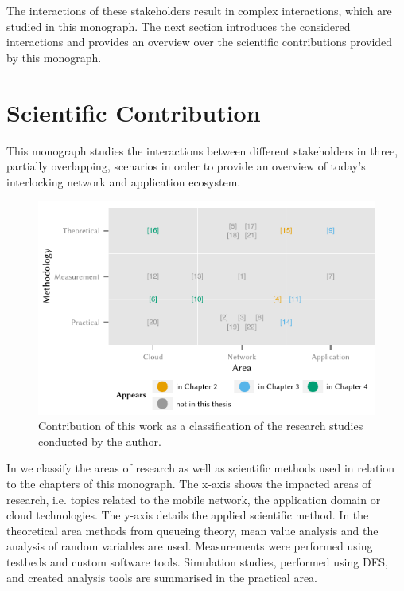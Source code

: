 The interactions of these stakeholders result in complex interactions, which are studied in this monograph.
The next section introduces the considered interactions and provides an overview over the scientific contributions provided by this monograph.

\section{Scientific Contribution}\label{sec:introduction:scientific_contribution}
This monograph studies the interactions between different stakeholders in three, partially overlapping, scenarios in order to provide an overview of today's interlocking network and application ecosystem.

\begin{figure}
\centering
\includegraphics{figures/publications}
\caption{Contribution of this work as a classification of the research studies conducted by the author.}\label{fig:introduction:publications}
\end{figure}

In  we classify the areas of research as well as scientific methods used in relation to the chapters of this monograph.
The x-axis shows the impacted areas of research, i.e. topics related to the mobile network, the application domain or cloud technologies.
The y-axis details the applied scientific method.
In the theoretical area methods from queueing theory, mean value analysis and the analysis of random variables are used.
Measurements were performed using testbeds and custom software tools.
Simulation studies, performed using \gls{DES}, and created analysis tools are summarised in the practical area.

